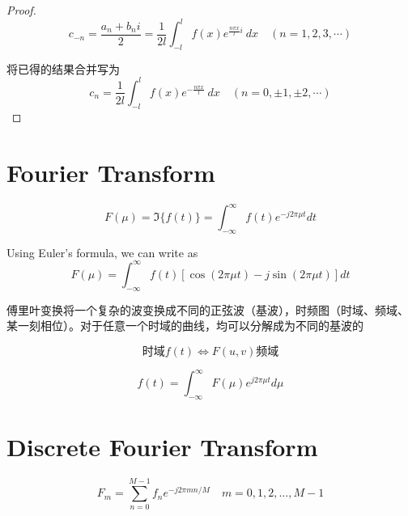 \begin{proof}
\begin{equation} c_{-n}=\frac{a_{n}+b_{n} {i}}{2}=\frac{1}{2 l} \int_{-l}^{l} f(x) {e}^{\frac{n \pi x}{l} i} {~d} x \quad(n=1,2,3, \cdots) \end{equation}

将已得的结果合并写为
\begin{equation}
c_{n}=\frac{1}{2 l} \int_{-l}^{l} f(x) {e}^{-\frac{n \pi x}{l}} {~d} x \quad(n=0, \pm 1, \pm 2, \cdots)
\end{equation}

\end{proof}

\section{Fourier Transform}

\begin{definition}
    \begin{equation}F(\mu) = \Im\{f(t)\}=\int_{-\infty}^{\infty} f(t) e^{-j 2 \pi \mu t} d t \end{equation}

    Using Euler's formula, we can write as
\begin{equation}
F(\mu)=\int_{-\infty}^{\infty} f(t)[\cos (2 \pi \mu t)-j \sin (2 \pi \mu t)] d t
\end{equation}
\end{definition}

傅里叶变换将一个复杂的波变换成不同的正弦波（基波），时频图（时域、频域、某一刻相位）。对于任意一个时域的曲线，均可以分解成为不同的基波的

\begin{equation}时域f(t) \Leftrightarrow F(u,v) 频域\end{equation}

\begin{definition}
    \begin{equation} f(t)=\int_{-\infty}^{\infty} F(\mu) e^{j 2 \pi \mu t} d \mu \end{equation}
\end{definition}


\section{Discrete Fourier Transform}

\begin{definition}
    \begin{equation} F_{m}=\sum_{n=0}^{M-1} f_{n} e^{-j 2 \pi m n / M} \quad m=0,1,2, \ldots, M-1 \end{equation}
\end{definition}

